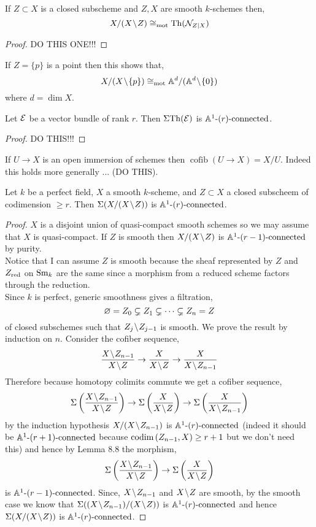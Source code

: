 \documentclass[12pt]{article}
\DeclareMathOperator{\cofib}{\mathrm{cofib}}
\begin{document}
\begin{lemma}
If $Z \subset X$ is a closed subscheme and $Z, X$ are smooth $k$-schemes then,
\[ X / (X \! \setminus \! Z) \cong_{\text{mot}} \mathrm{Th}( \mathcal{N}_{Z | X} )\]
\end{lemma}

\begin{proof}
DO THIS ONE!!!
\end{proof}

\begin{example}
If $Z = \{ p \}$ is a point then this shows that,
\[ X / (X \! \setminus \! \{ p \}) \cong_{\text{mot}} \mathbb{A}^d / (\mathbb{A}^d \! \setminus \! \{ 0 \}) \]
where $d = \dim{X}$. 
\end{example}


\begin{lemma}
Let $\mathcal{E}$ be a vector bundle of rank $r$. Then $\Sigma \mathrm{Th}(\mathcal{E})$ is $\mathbb{A}^1\text{-}(r)\text{-connected}$. 
\end{lemma}

\begin{proof}
DO THIS!!!
\end{proof}

\begin{rmk}
If $U \to X$ is an open immersion of schemes then $\cofib(U \to X) = X / U$. Indeed this holds more generally ... (DO THIS).
\end{rmk}

\begin{lemma}[8.9]
Let $k$ be a perfect field, $X$ a smooth $k$-scheme, and $Z \subset X$ a closed subscheem of codimension $\ge r$. Then $\Sigma(X/(X \! \setminus \! Z))$ is $\mathbb{A}^1\text{-}(r)\text{-connected}$. 
\end{lemma}

\begin{proof}
$X$ is a disjoint union of quasi-compact smooth schemes so we may assume that $X$ is quasi-compact. If $Z$ is smooth then $X / (X \! \setminus \! Z)$ is $\mathbb{A}^1\text{-}(r-1)\text{-connected}$ by purity.
\bigskip\\
Notice that I can assume $Z$ is smooth because the sheaf represented by $Z$ and $Z_{\mathrm{red}}$ on $\mathrm{Sm}_k$ are the same since a morphism from a reduced scheme factors through the reduction.
\bigskip\\
Since $k$ is perfect, generic smoothness gives a filtration,
\[ \varnothing = Z_0 \subsetneq Z_1 \subsetneq \cdots \subsetneq Z_n = Z \]
of closed subschemes such that $Z_j \! \setminus \! Z_{j-1}$ is smooth. We prove the result by induction on $n$. Consider the cofiber sequence,
\[ \frac{X \sm Z_{n-1}}{X \sm Z} \to \frac{X}{X \sm Z} \to \frac{X}{X \sm Z_{n-1}} \]
Therefore because homotopy colimits commute we get a cofiber sequence,
\[ \Sigma \left( \frac{X \sm Z_{n-1}}{X \sm Z} \right) \to \Sigma \left( \frac{X}{X \sm Z} \right) \to \Sigma \left( \frac{X}{X \sm Z_{n-1}} \right) \]
by the induction hypothesis $X / (X \! \setminus \! Z_{n-1})$ is $\mathbb{A}^1\text{-}(r)\text{-connected}$ (indeed it should be $\mathbb{A}^1\text{-}(r+1)\text{-connected}$ because $\mathrm{codim}\left( Z_{n-1}, X \right) \ge r + 1$ but we don't need this) and hence by Lemma 8.8 the morphism,
\[ \Sigma \left( \frac{X \! \setminus \! Z_{n-1}}{X \! \setminus \! Z} \right) \to \Sigma \left( \frac{X}{X \! \setminus \! Z} \right)  \]
is $\mathbb{A}^1\text{-}(r-1)\text{-connected}$. Since, $X \! \setminus \! Z_{n-1}$ and $X \! \setminus \! Z$ are smooth, by the smooth case we know that $\Sigma ((X \! \setminus \! Z_{n-1})/(X \! \setminus \! Z))$ is $\mathbb{A}^1\text{-}(r)\text{-connected}$ and hence $\Sigma( X / (X \! \setminus \! Z))$ is $\mathbb{A}^1\text{-}(r)\text{-connected}$.
\end{proof}
\end{document}
